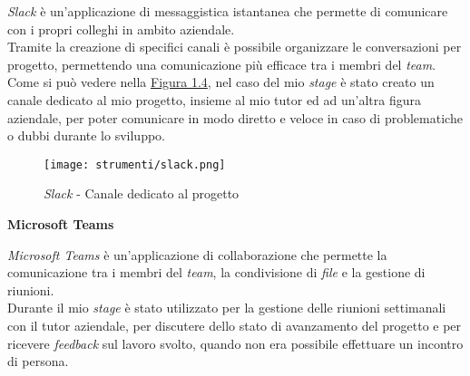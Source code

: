 \noindent \textit{Slack} è un'applicazione di messaggistica istantanea che permette di comunicare con i propri colleghi in ambito aziendale. \\
Tramite la creazione di specifici canali è possibile organizzare le conversazioni per progetto, permettendo una comunicazione più efficace tra i membri del \textit{team}.\\
Come si può vedere nella {\hyperref[fig:slack]{Figura 1.4}}, nel caso del mio \textit{stage} è stato creato un canale dedicato al mio progetto, insieme al mio tutor ed ad un'altra figura aziendale, 
per poter comunicare in modo diretto e veloce in caso di problematiche o dubbi durante lo sviluppo.

\begin{figure}[H]
    \label{fig:slack} 
    \centering
    \texttt{[image: strumenti/slack.png]}
    \caption{\textit{Slack} - Canale dedicato al progetto}
\end{figure}

\noindent \textbf{Microsoft Teams\\}

\noindent \textit{Microsoft Teams} è un'applicazione di collaborazione che permette la comunicazione tra i membri del \textit{team}, la condivisione di \textit{file} e la gestione di riunioni.\\
Durante il mio \textit{stage} è stato utilizzato per la gestione delle riunioni settimanali con il tutor aziendale, per discutere dello stato di avanzamento del progetto e per ricevere \textit{feedback} sul lavoro svolto, quando
non era possibile effettuare un incontro di persona.
